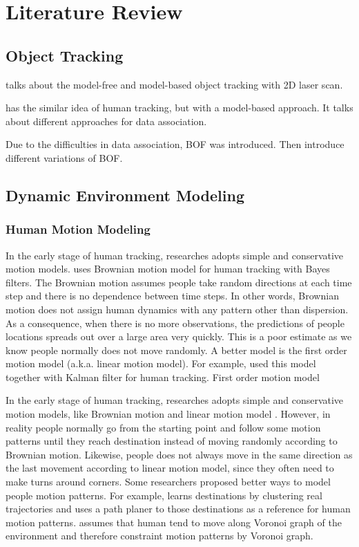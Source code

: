 \chapter{Literature Review} \label{chapter:2}

\section{Object Tracking}

\cite{wang2015model} talks about the model-free and model-based object tracking with 2D laser scan.

\cite{luber2011place} has the similar idea of human tracking, but with a model-based approach. It talks about different approaches for data association.

Due to the difficulties in data association, BOF\cite{coue2006bayesian} was introduced. Then introduce different variations of BOF.

\section{Dynamic Environment Modeling}

\subsection{Human Motion Modeling}

In the early stage of human tracking, researches adopts simple and conservative motion models. \citet{montemerlo2002conditional} uses Brownian motion model for human tracking with Bayes filters.  The Brownian motion assumes people take random directions at each time step and there is no dependence between time steps. In other words, Brownian motion does not assign human dynamics with any pattern other than dispersion. As a consequence, when there is no more observations, the predictions of people locations spreads out over a large area very quickly. This is a poor estimate as we know people normally does not move randomly. A better model is the first order motion model (a.k.a. linear motion model). For example, \citet{meier1999using} used this model together with Kalman filter for human tracking. First order motion model

In the early stage of human tracking, researches adopts simple and conservative motion models, like Brownian motion \citep{montemerlo2002conditional} and linear motion model \citep{meier1999using}. However, in reality people normally go from the starting point and follow some motion patterns until they reach destination instead of moving randomly according to Brownian motion. Likewise, people does not always move in the same direction as the last movement according to linear motion model, since they often need to make turns around corners. Some researchers proposed better ways to model people motion patterns. For example, \citet{bruce2004better} learns destinations by clustering real trajectories and uses a path planer to those destinations as a reference for human motion patterns. \citet{liao2003voronoi} assumes that human tend to move along Voronoi graph of the environment and therefore constraint motion patterns by Voronoi graph. 

